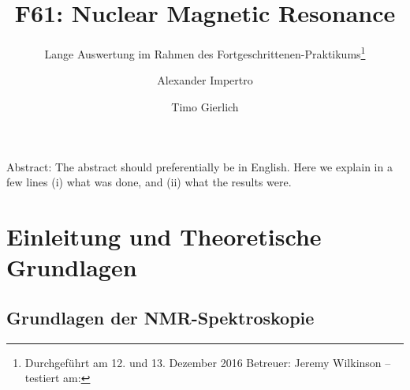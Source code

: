 \documentclass[a4paper]{scrartcl} %
\begin{document}
\author{Alexander Impertro \and Timo Gierlich}
\title{F61: Nuclear Magnetic Resonance}
\subtitle{Lange Auswertung im Rahmen des Fortgeschrittenen-Praktikums\footnote{Durchgeführt am 12. und 13. Dezember 2016 \newline Betreuer: Jeremy Wilkinson -- testiert am:}}
\maketitle
\tableofcontents


\vfill

\parbox{0.9\textwidth}{   %
	Abstract:    
	\small The abstract should preferentially be in English. Here we explain in a
	few lines (i) what was done, and (ii) what the results were.
}
\vfill

\newpage

\section{Einleitung und Theoretische Grundlagen}

\subsection{Grundlagen der NMR-Spektroskopie}
\end{document}
